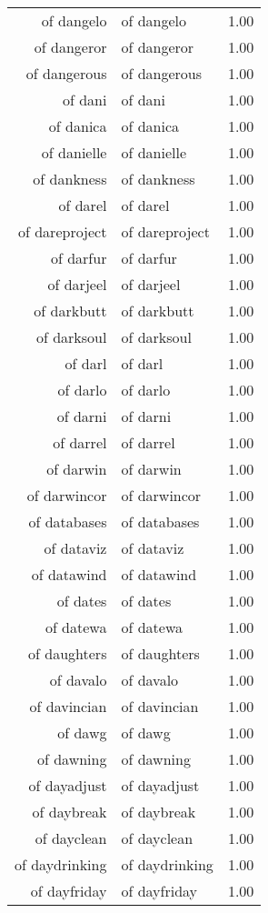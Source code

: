 \begin{table}[ht]
\begin{tabular}{rlr}
  of dangelo & of dangelo & 1.00 \\ 
  of dangeror & of dangeror & 1.00 \\ 
  of dangerous & of dangerous & 1.00 \\ 
  of dani & of dani & 1.00 \\ 
  of danica & of danica & 1.00 \\ 
  of danielle & of danielle & 1.00 \\ 
  of dankness & of dankness & 1.00 \\ 
  of darel & of darel & 1.00 \\ 
  of dareproject & of dareproject & 1.00 \\ 
  of darfur & of darfur & 1.00 \\ 
  of darjeel & of darjeel & 1.00 \\ 
  of darkbutt & of darkbutt & 1.00 \\ 
  of darksoul & of darksoul & 1.00 \\ 
  of darl & of darl & 1.00 \\ 
  of darlo & of darlo & 1.00 \\ 
  of darni & of darni & 1.00 \\ 
  of darrel & of darrel & 1.00 \\ 
  of darwin & of darwin & 1.00 \\ 
  of darwincor & of darwincor & 1.00 \\ 
  of databases & of databases & 1.00 \\ 
  of dataviz & of dataviz & 1.00 \\ 
  of datawind & of datawind & 1.00 \\ 
  of dates & of dates & 1.00 \\ 
  of datewa & of datewa & 1.00 \\ 
  of daughters & of daughters & 1.00 \\ 
  of davalo & of davalo & 1.00 \\ 
  of davincian & of davincian & 1.00 \\ 
  of dawg & of dawg & 1.00 \\ 
  of dawning & of dawning & 1.00 \\ 
  of dayadjust & of dayadjust & 1.00 \\ 
  of daybreak & of daybreak & 1.00 \\ 
  of dayclean & of dayclean & 1.00 \\ 
  of daydrinking & of daydrinking & 1.00 \\ 
  of dayfriday & of dayfriday & 1.00 \\ 

\end{tabular}
\end{table}
